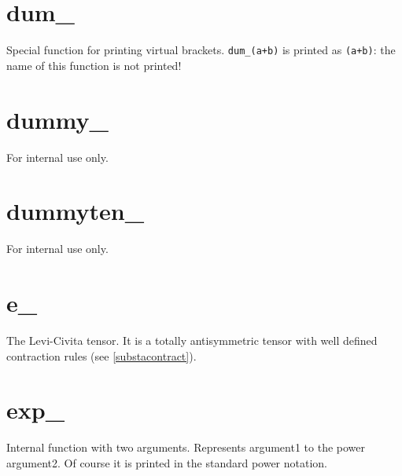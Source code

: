
\section{dum\_}
\label{fundum}
\noindent Special function for printing virtual 
brackets. \verb:dum_(a+b): is printed as \verb:(a+b):: the 
name of this function is not printed!


\section{dummy\_}
\label{fundummy}
\noindent For internal use only.


\section{dummyten\_}
\label{fundummyten}
\noindent For internal use only.


\section{e\_}
\label{fune}
\noindent The Levi-Civita 
tensor. It is a totally 
antisymmetric tensor with well defined contraction 
rules (see \ref{substacontract}).

%
%

\section{exp\_}
\label{funexp}
\noindent Internal function with two arguments. Represents 
argument1 to the power argument2. Of course it is printed in the standard 
power notation.

